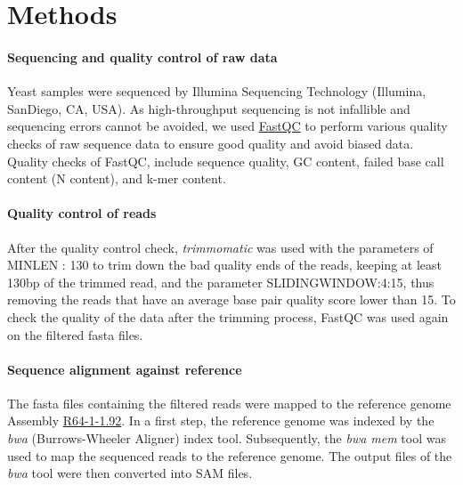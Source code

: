 \documentclass[10pt,a4paper]{article}
\begin{document}
\section*{\large Methods}

\paragraph{Sequencing and quality control of raw data} Yeast samples were sequenced by Illumina Sequencing Technology (Illumina, SanDiego, CA, USA). As high-throughput sequencing is not infallible and sequencing errors cannot be avoided, we used \href{http://www.bioinformatics.babraham.ac.uk/projects/fastqc/}{FastQC} to perform various quality checks of raw sequence data to ensure good quality and avoid biased data. Quality checks of FastQC, include sequence quality, GC content, failed base call content (N content), and k-mer content.



\paragraph{Quality control of reads} After the quality control check, \textit{trimmomatic}\cite{bolger_trimmomatic:_2014} was used with the parameters of MINLEN : 130 to trim down the bad quality ends of the reads, keeping at least 130bp of the trimmed read, and the parameter SLIDINGWINDOW:4:15, thus removing the reads that have an average base pair quality score lower than 15. To check the quality of the data after the trimming process, FastQC was used again on the filtered fasta files.

\paragraph{Sequence alignment against reference} The fasta files containing the filtered reads were mapped to the reference genome Assembly \href{https://www.ensembl.org/Saccharomyces_cerevisiae/Info/Index}{R64-1-1.92}. In a first step, the reference genome was indexed by the \textit{bwa} (Burrows-Wheeler Aligner) index tool\cite{li_fast_2010}. Subsequently, the \textit{bwa mem} tool was used to map the sequenced reads to the reference genome. The output files of the \textit{bwa} tool were then converted into SAM files\cite{li_sequence_2009}.
 
\end{document}
